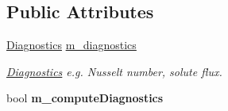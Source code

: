 \subsection*{Public Attributes}
\begin{DoxyCompactItemize}
\item 
\hypertarget{class_a_m_r_level_mushy_layer_a280fdf87f2f58ddc25250fff6b6c9f19}{\hyperlink{class_diagnostics}{Diagnostics} \hyperlink{class_a_m_r_level_mushy_layer_a280fdf87f2f58ddc25250fff6b6c9f19}{m\-\_\-diagnostics}}\label{class_a_m_r_level_mushy_layer_a280fdf87f2f58ddc25250fff6b6c9f19}

\begin{DoxyCompactList}\small\item\em \hyperlink{class_diagnostics}{Diagnostics} e.\-g. Nusselt number, solute flux. \end{DoxyCompactList}\item 
\hypertarget{class_a_m_r_level_mushy_layer_afd5628964f3f9b398facc7098e27945b}{bool {\bfseries m\-\_\-compute\-Diagnostics}}\label{class_a_m_r_level_mushy_layer_afd5628964f3f9b398facc7098e27945b}

\end{DoxyCompactItemize}
